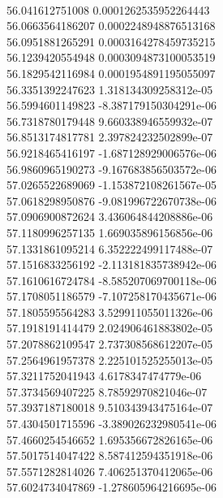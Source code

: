 { \\
56.041612751008 0.0001262535952264443
 \\
56.0663564186207 0.0002248948876513168
 \\
56.0951881265291 0.0003164278459735215
 \\
56.1239420554948 0.0003094873100053519
 \\
56.1829542116984 0.0001954891195055097
 \\
56.3351392247623 1.318134309258312e-05
 \\
56.5994601149823 -8.387179150304291e-06
 \\
56.7318780179448 9.660338946559932e-07
 \\
56.8513174817781 2.397824232502899e-07
 \\
56.9218465416197 -1.687128929006576e-06
 \\
56.9860965190273 -9.167683856503572e-06
 \\
57.0265522689069 -1.153872108261567e-05
 \\
57.0618298950876 -9.081996722670738e-06
 \\
57.0906900872624 3.436064844208886e-06
 \\
57.1180996257135 1.669035896156856e-06
 \\
57.1331861095214 6.352222499117488e-07
 \\
57.1516833256192 -2.113181835738942e-06
 \\
57.1610616724784 -8.585207069700118e-06
 \\
57.1708051186579 -7.107258170435671e-06
 \\
57.1805595564283 3.529911055011326e-06
 \\
57.1918191414479 2.024906461883802e-05
 \\
57.2078862109547 2.737308568612207e-05
 \\
57.2564961957378 2.225101525255013e-05
 \\
57.3211752041943 4.6178347474779e-06
 \\
57.3734569407225 8.78592970821046e-07
 \\
57.3937187180018 9.510343943475164e-07
 \\
57.4304501715596 -3.389026232980541e-06
 \\
57.4660254546652 1.695356672826165e-06
 \\
57.5017514047422 8.587412594351918e-06
 \\
57.5571282814026 7.406251370412065e-06
 \\
57.6024734047869 -1.278605964216695e-06
 \\
}
